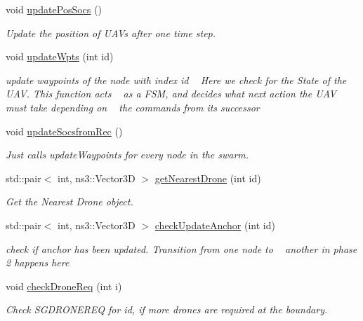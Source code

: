 \begin{DoxyCompactItemize}
void \hyperlink{classrnl_1_1Planner_a061cc38c2b562945f8ee8b6b8a1772a4}{update\+Pos\+Socs} ()
\begin{DoxyCompactList}\small\item\em Update the position of U\+A\+Vs after one time step. \end{DoxyCompactList}\item 
void \hyperlink{classrnl_1_1Planner_a71cf439e458cf58689e2411a4d0cb62e}{update\+Wpts} (int id)
\begin{DoxyCompactList}\small\item\em update waypoints of the node with index id ~\newline
Here we check for the State of the U\+AV. This function acts ~\newline
as a F\+SM, and decides what next action the U\+AV must take depending on ~\newline
the commands from its successor \end{DoxyCompactList}\item 
\mbox{\label{classrnl_1_1Planner_ab39b9823d3a0748929fea096ed99500a}} 
void \hyperlink{classrnl_1_1Planner_ab39b9823d3a0748929fea096ed99500a}{update\+Socsfrom\+Rec} ()
\begin{DoxyCompactList}\small\item\em Just calls update\+Waypoints for every node in the swarm. \end{DoxyCompactList}\item 
std\+::pair$<$ int, ns3\+::\+Vector3D $>$ \hyperlink{classrnl_1_1Planner_a0db9729980ce17b373211f86740589ae}{get\+Nearest\+Drone} (int id)
\begin{DoxyCompactList}\small\item\em Get the Nearest Drone object. \end{DoxyCompactList}\item 
std\+::pair$<$ int, ns3\+::\+Vector3D $>$ \hyperlink{classrnl_1_1Planner_a023f298c358c86118a3c66e5f62c6121}{check\+Update\+Anchor} (int id)
\begin{DoxyCompactList}\small\item\em check if anchor has been updated. Transition from one node to ~\newline
another in phase 2 happens here \end{DoxyCompactList}\item 
void \hyperlink{classrnl_1_1Planner_a39264641415dc64fe44ab2c8266128fc}{check\+Drone\+Req} (int i)
\begin{DoxyCompactList}\small\item\em Check S\+G\+D\+R\+O\+N\+E\+R\+EQ for id, if more drones are required at the boundary. \end{DoxyCompactList}\item 

\end{DoxyCompactItemize}
